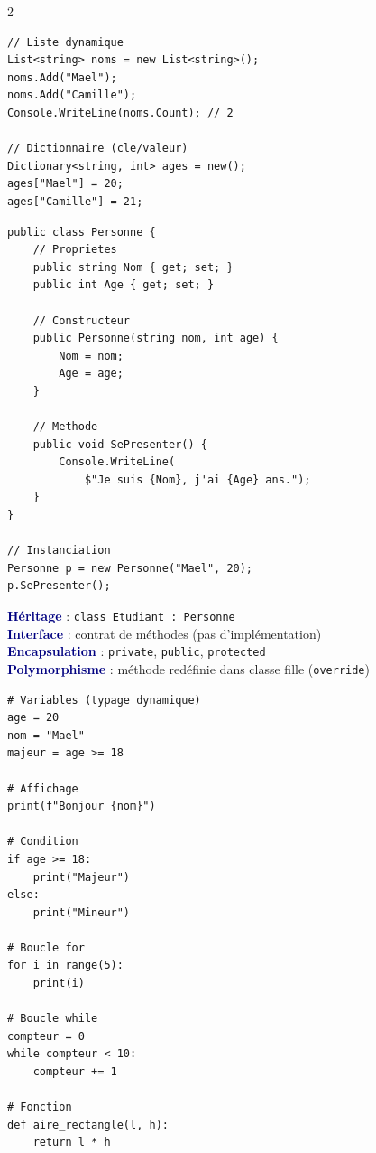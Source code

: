 \documentclass[a4paper,10pt]{article}
\newcommand{\key}[1]{\textbf{\textcolor{navy}{#1}}}
\begin{document}
\begin{multicols}{2}
\begin{tcolorbox}[basebox, colframe=green, title=5. C\# — Tableaux et collections]
\begin{lstlisting}[style=csharp]
// Liste dynamique
List<string> noms = new List<string>();
noms.Add("Mael");
noms.Add("Camille");
Console.WriteLine(noms.Count); // 2

// Dictionnaire (cle/valeur)
Dictionary<string, int> ages = new();
ages["Mael"] = 20;
ages["Camille"] = 21;
\end{lstlisting}
\end{tcolorbox}

\begin{tcolorbox}[basebox, colframe=navy, title=6. C\# — Programmation Orientée Objet]
\begin{lstlisting}[style=csharp]
public class Personne {
    // Proprietes
    public string Nom { get; set; }
    public int Age { get; set; }

    // Constructeur
    public Personne(string nom, int age) {
        Nom = nom;
        Age = age;
    }

    // Methode
    public void SePresenter() {
        Console.WriteLine(
            $"Je suis {Nom}, j'ai {Age} ans.");
    }
}

// Instanciation
Personne p = new Personne("Mael", 20);
p.SePresenter();
\end{lstlisting}
\vspace{4pt}
\key{Héritage} : \texttt{class Etudiant : Personne} \\
\key{Interface} : contrat de méthodes (pas d'implémentation) \\
\key{Encapsulation} : \texttt{private}, \texttt{public}, \texttt{protected} \\
\key{Polymorphisme} : méthode redéfinie dans classe fille (\texttt{override})
\end{tcolorbox}

\begin{tcolorbox}[basebox, colframe=teal, title=7. Python — Bases]
\begin{lstlisting}[style=python]
# Variables (typage dynamique)
age = 20
nom = "Mael"
majeur = age >= 18

# Affichage
print(f"Bonjour {nom}")

# Condition
if age >= 18:
    print("Majeur")
else:
    print("Mineur")

# Boucle for
for i in range(5):
    print(i)

# Boucle while
compteur = 0
while compteur < 10:
    compteur += 1

# Fonction
def aire_rectangle(l, h):
    return l * h


\end{lstlisting}
\end{tcolorbox}
\end{multicols}
\end{document}
